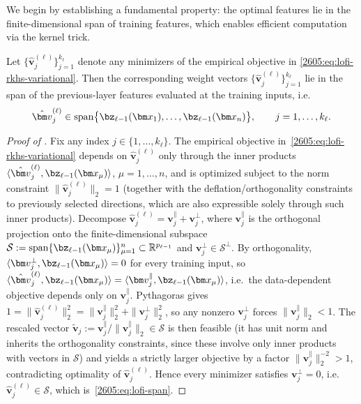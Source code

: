 We begin by establishing a fundamental property: the optimal features lie in the finite-dimensional span of training features, which enables efficient computation via the kernel trick.

\begin{lemma}\label{2605:lem:representer-lofi}
    Let $\{\hat{\bm v}_j^{(\ell)}\}_{j=1}^{k_\ell}$ denote any minimizers of the empirical objective in \eqref{2605:eq:lofi-rkhs-variational}. Then the corresponding weight vectors $\{\hat{\bm v}_j^{(\ell)}\}_{j=1}^{k_\ell}$ lie in the span of the previous-layer features evaluated at the training inputs, i.e.\
    \begin{equation}\label{2605:eq:lofi-span}
        \hat{\bm v}_j^{(\ell)} \in \mathrm{span}\bigl\{\bz_{\ell-1}(\bm x_1),\dots,\bz_{\ell-1}(\bm x_n)\bigr\}, \qquad j=1,\dots,k_\ell.
    \end{equation}
\end{lemma}
\begin{proof}[Proof of ]
Fix any index $j\in\{1,\dots,k_\ell\}$. The empirical objective in~\eqref{2605:eq:lofi-rkhs-variational} depends on $\hat{\bm v}_j^{(\ell)}$ only through the inner products $\langle \hat{\bm v}_j^{(\ell)}, \bz_{\ell-1}(\bm x_\mu)\rangle$, $\mu=1,\dots,n$, and is optimized subject to the norm constraint $\|\hat{\bm v}_j^{(\ell)}\|_2 = 1$ (together with the deflation/orthogonality constraints to previously selected directions, which are also expressible solely through such inner products). Decompose $\hat{\bm v}_j^{(\ell)} = \bm v_j^\parallel + \bm v_j^\perp$, where $\bm v_j^\parallel$ is the orthogonal projection onto the finite-dimensional subspace $\mathcal{S} := \mathrm{span}\{\bz_{\ell-1}(\bm x_\mu)\}_{\mu=1}^n \subset \mathbb{R}^{p_{\ell-1}}$ and $\bm v_j^\perp \in \mathcal{S}^\perp$. By orthogonality, $\langle \bm v_j^\perp, \bz_{\ell-1}(\bm x_\mu)\rangle = 0$ for every training input, so $\langle \hat{\bm v}_j^{(\ell)}, \bz_{\ell-1}(\bm x_\mu)\rangle = \langle \bm v_j^\parallel, \bz_{\ell-1}(\bm x_\mu)\rangle$, i.e.\ the data-dependent objective depends only on $\bm v_j^\parallel$. Pythagoras gives $1 = \|\hat{\bm v}_j^{(\ell)}\|_2^2 = \|\bm v_j^\parallel\|_2^2 + \|\bm v_j^\perp\|_2^2$, so any nonzero $\bm v_j^\perp$ forces $\|\bm v_j^\parallel\|_2 < 1$. The rescaled vector $\tilde{\bm v}_j := \bm v_j^\parallel/\|\bm v_j^\parallel\|_2 \in \mathcal{S}$ is then feasible (it has unit norm and inherits the orthogonality constraints, since these involve only inner products with vectors in $\mathcal{S}$) and yields a strictly larger objective by a factor $\|\bm v_j^\parallel\|_2^{-2}>1$, contradicting optimality of $\hat{\bm v}_j^{(\ell)}$. Hence every minimizer satisfies $\bm v_j^\perp = 0$, i.e.\ $\hat{\bm v}_j^{(\ell)} \in \mathcal{S}$, which is~\eqref{2605:eq:lofi-span}.
\end{proof}

